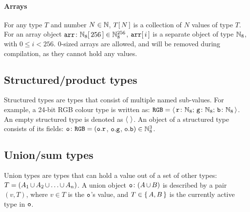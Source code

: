 \paragraph{Arrays}
For any type $T$ and number $N\in\mathbb{N}$, $\carray{T}{N}$ is a collection of $N$ values of type $T$.
For an array object $\var{arr}{\carray{\N_8}{256}} \in \N_8^{256}$, $\carray{\cn{arr}}{i}$ is a separate object of type $\mathbb{N}_8$, with $0\le i <256$.
$0$-sized arrays are allowed, and will be removed during compilation, as they cannot hold any values.

\subsection{Structured/product types}
Structured types are types that consist of multiple named sub-values.
For example, a 24-bit RGB colour type is written as:
	$\cn{RGB} = \struct{\var{r}{\N_8}}{\var{g}{\N_8}}{\var{b}{\N_8}}$.
An empty structured type is denoted as $\struct$.
An object of a structured type consists of its fields:
	$\var{o}{\cn{RGB}}=(\memb{\cn{o}}{r}$, $\memb{\cn{o}}{g}$, $\memb{\cn{o}}{b}) \in \N_8^3$.

\subsection{Union/sum types}
Union types are types that can hold a value out of a set of other types:
$T = \union{A_1}{A_2}{\ldots}{A_n}$.
A union object $\var{o}{\union{A}{B}}$ is described by a pair $(v, T)$, where $v \in T$ is the $\mathtt{o}$'s value, and $T \in \left\{\,A, B\,\right\}$ is the currently active type in $\mathtt{o}$.
